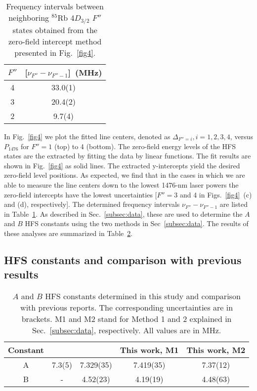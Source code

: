 \documentclass[reprint, amsmath,amssymb, aps, pra, longbibliography]{revtex4-1}
\begin{document}
\begin{center}
\begin{table}[htb]
\caption{\label{tab:table1} Frequency intervals between neighboring $^{85}$Rb 4$D_{3/2}$ $F''$ states obtained from the zero-field intercept
method presented in Fig.~\ref{fig4}.}
\begin{tabular}{|c| c|}
    \hline
    $F''$ & [$\nu_{F''}-\nu_{F''-1}$]~(MHz)\\
    \hline
    4 & 33.0(1)\\
    3 & 20.4(2)\\
    2 & 9.7(4)\\
    \hline
\end{tabular}
\end{table}
\end{center}

In Fig.~\ref{fig4} we plot the fitted line centers, denoted as $\Delta_{F'' = i}, i = 1, 2, 3, 4$, versus $P_{1476}$ for $F''=1$ (top) to 4 (bottom). The zero-field energy levels of the HFS states are the extracted by fitting the data by linear functions. The fit results are shown in Fig.~\ref{fig4} as solid lines. The extracted y-intercepts yield the desired zero-field level positions. As expected, we find that in the cases in which we are able to measure the line centers down to the lowest 1476-nm laser powers the zero-field intercepts have the lowest uncertainties [$F'' = 3$ and 4 in Figs.~\ref{fig4}~(c) and (d), respectively]. The determined frequency intervals $\nu_{F''} - \nu_{F''-1}$ are listed in Table~\ref{tab:table1}. As described in Sec.~\ref{subsec:data}, these are used to determine the $A$ and $B$ HFS constants using the two methods
in Sec~\ref{subsec:data}. The results of these analyses are summarized in Table~\ref{tab:table2}.


\subsection{HFS constants and comparison with previous results}
\label{subsec:compare}


\begin{table}[htb]
\caption{\label{tab:table2} $A$ and $B$ HFS constants determined in this study and comparison with previous reports. The corresponding uncertainties are in brackets. M1 and M2 stand for Method 1 and 2 explained in Sec.~\ref{subsec:data}, respectively. All values are in MHz.}
\begin{tabular}{|c |c |c |c |c |}
    \hline
    Constant & \cite{liao1974} & \cite{moon2009} & This work, M1 & This work, M2\\
    \hline
    A & 7.3(5) & 7.329(35) & 7.419(35) & 7.37(12)\\
    B & - & 4.52(23) & 4.19(19) & 4.48(63)\\
    \hline
\end{tabular}
\end{table}
\end{document}
